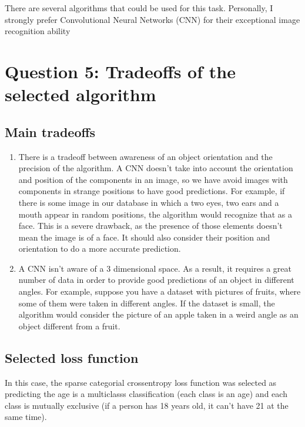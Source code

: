 \documentclass[11pt]{article}
\begin{document}
    There are several algorithms that could be used for this task.
Personally, I strongly prefer Convolutional Neural Networks (CNN) for
their exceptional image recognition ability

    \hypertarget{question-5-tradeoffs-of-the-selected-algorithm}{%
\section*{Question 5: Tradeoffs of the selected
algorithm}\label{question-5-tradeoffs-of-the-selected-algorithm}}

    \hypertarget{main-tradeoffs}{%
\subsection*{Main tradeoffs}\label{main-tradeoffs}}

    \begin{enumerate}
\def\labelenumi{\arabic{enumi}.}
\item
  There is a tradeoff between awareness of an object orientation and the
  precision of the algorithm. A CNN doesn't take into account the
  orientation and position of the components in an image, so we have
  avoid images with components in strange positions to have good
  predictions. For example, if there is some image in our database in
  which a two eyes, two ears and a mouth appear in random positions, the
  algorithm would recognize that as a face. This is a severe drawback,
  as the presence of those elements doesn't mean the image is of a face.
  It should also consider their position and orientation to do a more
  accurate prediction.
\item
  A CNN isn't aware of a 3 dimensional space. As a result, it requires a
  great number of data in order to provide good predictions of an object
  in different angles. For example, suppose you have a dataset with
  pictures of fruits, where some of them were taken in different angles.
  If the dataset is small, the algorithm would consider the picture of
  an apple taken in a weird angle as an object different from a fruit.
\end{enumerate}

    \hypertarget{selected-loss-function}{%
\subsection*{Selected loss function}\label{selected-loss-function}}

    In this case, the sparse categorial crossentropy loss function was
selected as predicting the age is a multiclasss classification (each
class is an age) and each class is mutually exclusive (if a person has
18 years old, it can't have 21 at the same time).
\end{document}

